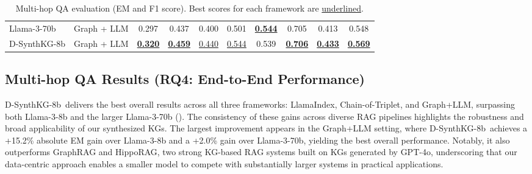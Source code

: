 \documentclass{article} %
\newcommand{\distilledLlama}{\textrm{D-SynthKG-8b}}
\begin{document}
\begin{table}[ht]
{\begin{tabular}{llcccccccc}
    Llama-3-70b & Graph + LLM & 0.297 & 0.437 & 0.400 & 0.501 & \underline{\textbf{0.544}} & 0.705 & 0.413 & 0.548 \\
    \distilledLlama & Graph + LLM  & \underline{\textbf{0.320}} & \underline{\textbf{0.459}} & \underline{0.440} & \underline{0.544} & 0.539 & \underline{\textbf{0.706}} & \underline{\textbf{0.433}} & \underline{\textbf{0.569}} \\ 
    \bottomrule
    \end{tabular}
    }
    \caption{
    Multi-hop QA evaluation (EM and F1 score). Best scores for each framework are \underline{underlined}.
    }
    \label{tab:main_qa_result}
\end{table}



\subsection{Multi-hop QA Results (RQ4: End-to-End Performance)}
\distilledLlama\ delivers the best overall results across all three frameworks: LlamaIndex, Chain-of-Triplet, and Graph+LLM, surpassing both Llama-3-8b and the larger Llama-3-70b (). The consistency of these gains across diverse RAG pipelines highlights the robustness and broad applicability of our synthesized KGs. The largest improvement appears in the Graph+LLM setting, where \distilledLlama\ achieves a +15.2\% absolute EM gain over Llama-3-8b and a +2.0\% gain over Llama-3-70b, yielding the best overall performance. Notably, it also outperforms GraphRAG and HippoRAG, two strong KG-based RAG systems built on KGs generated by GPT-4o, underscoring that our data-centric approach enables a smaller model to compete with substantially larger systems in practical applications.

\end{document}
